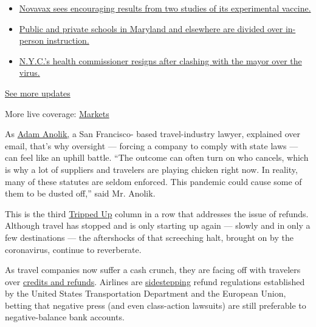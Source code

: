 \begin{itemize}
\tightlist
\item
  \href{https://www.nytimes.com/2020/08/04/world/coronavirus-cases.html?action=click\&pgtype=Article\&state=default\&region=MAIN_CONTENT_1\&context=storylines_live_updates\#link-1228a480}{Novavax
  sees encouraging results from two studies of its experimental
  vaccine.}
\item
  \href{https://www.nytimes.com/2020/08/04/world/coronavirus-cases.html?action=click\&pgtype=Article\&state=default\&region=MAIN_CONTENT_1\&context=storylines_live_updates\#link-4825b93}{Public
  and private schools in Maryland and elsewhere are divided over
  in-person instruction.}
\item
  \href{https://www.nytimes.com/2020/08/04/world/coronavirus-cases.html?action=click\&pgtype=Article\&state=default\&region=MAIN_CONTENT_1\&context=storylines_live_updates\#link-4d1eafa8}{N.Y.C.'s
  health commissioner resigns after clashing with the mayor over the
  virus.}
\end{itemize}

\href{https://www.nytimes.com/2020/08/04/world/coronavirus-cases.html?action=click\&pgtype=Article\&state=default\&region=MAIN_CONTENT_1\&context=storylines_live_updates}{See
more updates}

More live coverage:
\href{https://www.nytimes.com/live/2020/08/04/business/stock-market-today-coronavirus?action=click\&pgtype=Article\&state=default\&region=MAIN_CONTENT_1\&context=storylines_live_updates}{Markets}

As \href{https://travellaw.com/}{Adam Anolik,} a San Francisco- based
travel-industry lawyer, explained over email, that's why oversight ---
forcing a company to comply with state laws --- can feel like an uphill
battle. ``The outcome can often turn on who cancels, which is why a lot
of suppliers and travelers are playing chicken right now. In reality,
many of these statutes are seldom enforced. This pandemic could cause
some of them to be dusted off,'' said Mr. Anolik.

This is the third
\href{https://www.nytimes.com/column/tripped-up}{Tripped Up} column in a
row that addresses the issue of refunds. Although travel has stopped and
is only starting up again --- slowly and in only a few destinations ---
the aftershocks of that screeching halt, brought on by the coronavirus,
continue to reverberate.

As travel companies now suffer a cash crunch, they are facing off with
travelers over
\href{https://www.nytimes.com/2020/05/12/travel/refunds-or-credits-travelers-and-businesses-face-off.html}{credits
and refunds}. Airlines are
\href{https://www.nytimes.com/2020/05/01/travel/trip-refund-airlines.html}{sidestepping}
refund regulations established by the United States Transportation
Department and the European Union, betting that negative press (and even
class-action lawsuits) are still preferable to negative-balance bank
accounts.

